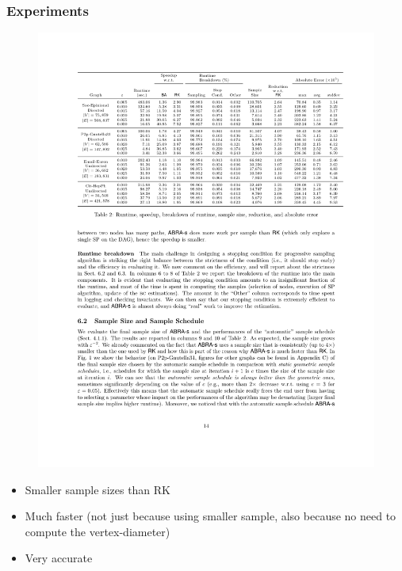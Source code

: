\begin{frame}
  \frametitle{Experiments}
  \begin{figure}
    \includegraphics[width=\textwidth]{imgs/RiondatoU-table.pdf}
  \end{figure}
  \begin{itemize}
    \item Smaller sample sizes than RK
    \item Much faster (not just because using smaller sample, also because no
      need to compute the vertex-diameter)
    \item Very accurate
  \end{itemize}
\end{frame}

